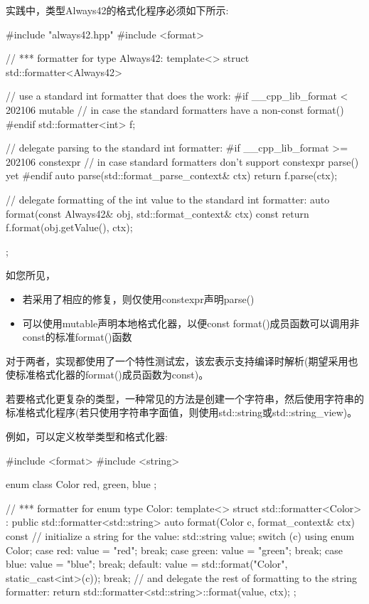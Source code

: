 实践中，类型Always42的格式化程序必须如下所示:


\begin{cpp}
#include "always42.hpp"
#include <format>

// *** formatter for type Always42:
template<>
struct std::formatter<Always42>
{
	// use a standard int formatter that does the work:
#if __cpp_lib_format < 202106
	mutable // in case the standard formatters have a non-const format()
#endif
	std::formatter<int> f;

	// delegate parsing to the standard int formatter:
#if __cpp_lib_format >= 202106
	constexpr // in case standard formatters don’t support constexpr parse() yet
#endif
	auto parse(std::format_parse_context& ctx) {
		return f.parse(ctx);
	}

	// delegate formatting of the int value to the standard int formatter:
	auto format(const Always42& obj, std::format_context& ctx) const {
		return f.format(obj.getValue(), ctx);
	}
};
\end{cpp}

如您所见，

\begin{itemize}
\item
若采用了相应的修复，则仅使用constexpr声明parse()

\item
可以使用mutable声明本地格式化器，以便const format()成员函数可以调用非const的标准format()函数
\end{itemize}

对于两者，实现都使用了一个特性测试宏，该宏表示支持编译时解析(期望采用也使标准格式化器的format()成员函数为const)。


若要格式化更复杂的类型，一种常见的方法是创建一个字符串，然后使用字符串的标准格式化程序(若只使用字符串字面值，则使用std::string或std::string\_view)。

例如，可以定义枚举类型和格式化器:


\begin{cpp}
#include <format>
#include <string>

enum class Color { red, green, blue };

// *** formatter for enum type Color:
template<>
struct std::formatter<Color> : public std::formatter<std::string>
{
	auto format(Color c, format_context& ctx) const {
		// initialize a string for the value:
		std::string value;
		switch (c) {
			using enum Color;
			case red:
				value = "red";
				break;
			case green:
				value = "green";
				break;
			case blue:
				value = "blue";
				break;
			default:
				value = std::format("Color{}", static_cast<int>(c));
				break;
		}
		// and delegate the rest of formatting to the string formatter:
		return std::formatter<std::string>::format(value, ctx);
	}
};
\end{cpp}

